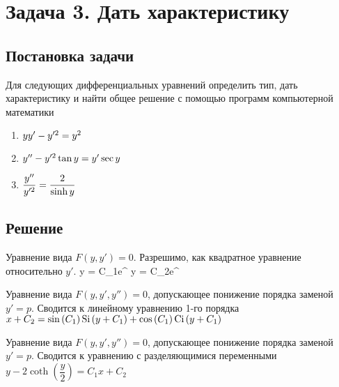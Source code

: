 

\section{Задача 3. Дать характеристику}
\subsection{Постановка задачи}
Для следующих дифференциальных уравнений определить тип, дать характеристику 
и найти общее решение с помощью программ компьютерной математики

\begin{enumerate}
	\item $ yy'-y'^2=y^2 $
	\item $ y''-y'^2\tan{y}=y'\sec{y} $
	\item $ \dfrac{y''}{y'^2}=\dfrac{2}{\sinh{y}} $
\end{enumerate}

\newpage

\subsection{Решение}
\begin{enumerate}
	\solutionItemThird
		{\equationFirst}
		{
			Уравнение вида $ F(y, y') = 0 $.
		}
		{Разрешимо, как квадратное уравнение относительно $ y' $.}
		{
			\customCases
				{y = C_1e^{}}
				{y = C_2e^{}}
		}
	
	\vspace{1.5em}

	\solutionItemThird
		{\equationSecond}
		{
			Уравнение вида $ F(y, y', y'') = 0 $, допускающее 
			понижение порядка заменой $ y' = p $. 
		}
		{Сводится к линейному уравнению 1-го порядка}
		{$ x + C_2 = \sin{(C_1)} \operatorname{Si}{(y + C_1)} + \cos{(C_1)} \operatorname{Ci}{(y + C_1)} $}
		
	\vspace{1.5em}	
		
	\solutionItemThird
		{\equationThird}
		{ 
			Уравнение вида $ F(y, y', y'') = 0 $, допускающее
			понижение порядка заменой $ y' = p $.
		}
		{Сводится к уравнению с разделяющимися переменными}
		{$ y - 2\coth{\left(\dfrac{y}{2}\right)} = C_1x + C_2 $}
\end{enumerate}
